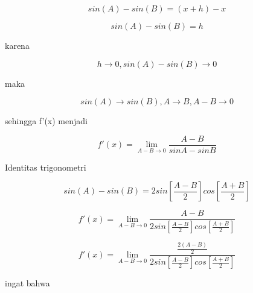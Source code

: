 \documentclass[a4paper,10pt]{article}
\begin{document}
\begin{eulernotebook}
\begin{eulercomment}
\begin{eulercomment}
\begin{eulercomment}
\begin{eulercomment}
\begin{eulercomment}
\begin{eulercomment}
\begin{eulercomment}
\begin{eulercomment}
\begin{eulercomment}
\begin{eulercomment}
\begin{eulercomment}
\begin{eulercomment}
\begin{eulercomment}
\begin{eulercomment}
\begin{eulercomment}
\begin{eulercomment}
\begin{eulercomment}
\begin{eulercomment}
\begin{eulercomment}
\begin{eulercomment}
\begin{eulercomment}
\end{eulercomment}
\begin{eulerformula}
\[
sin(A)-sin(B)=(x+h)-x
\]
\end{eulerformula}
\begin{eulerformula}
\[
sin(A)-sin(B) = h
\]
\end{eulerformula}
\begin{eulercomment}
karena\\
\end{eulercomment}
\begin{eulerformula}
\[
h \to 0, sin(A)-sin(B) \to 0
\]
\end{eulerformula}
\begin{eulercomment}
maka\\
\end{eulercomment}
\begin{eulerformula}
\[
sin(A)\to sin(B),  A \to B, A-B \to 0
\]
\end{eulerformula}
\begin{eulercomment}
sehingga f'(x) menjadi\\
\end{eulercomment}
\begin{eulerformula}
\[
f'(x) = \lim_{A-B \to 0} \frac{A-B}{sin A- sin B}
\]
\end{eulerformula}
\begin{eulercomment}
Identitas trigonometri\\
\end{eulercomment}
\begin{eulerformula}
\[
sin(A)-sin(B) = 2 sin[\frac{A-B}{2}]cos[\frac{A+B}{2}]
\]
\end{eulerformula}
\begin{eulercomment}
\end{eulercomment}
\begin{eulerformula}
\[
f'(x) = \lim_{A-B \to 0} \frac {A-B}{2 sin [\frac{A-B}{2}] cos [\frac{A+B}{2}]}
\]
\end{eulerformula}
\begin{eulerformula}
\[
f'(x) = \lim_{A-B \to 0} \frac {\frac{2(A-B)}{2}}{2 sin [\frac{A-B}{2}] cos [\frac{A+B}{2}]}
\]
\end{eulerformula}
\begin{eulercomment}
ingat bahwa\\
\end{eulercomment}
\begin{eulerformula}

\end{eulerformula}
\end{eulercomment}
\end{eulercomment}
\end{eulercomment}
\end{eulercomment}
\end{eulercomment}
\end{eulercomment}
\end{eulercomment}
\end{eulercomment}
\end{eulercomment}
\end{eulercomment}
\end{eulercomment}
\end{eulercomment}
\end{eulercomment}
\end{eulercomment}
\end{eulercomment}
\end{eulercomment}
\end{eulercomment}
\end{eulercomment}
\end{eulercomment}
\end{eulercomment}
\end{eulernotebook}
\end{document}
